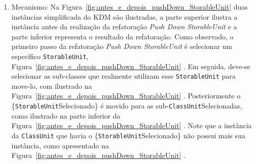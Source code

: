 \begin{enumerate}
\begin{enumerate}
			\item Mecanismo: Na Figura~\ref{fig:antes_e_depois_pushDown_StorableUnit} duas instâncias simplificada do KDM são ilustradas, a parte superior ilustra a instância antes da realização da refatoração \textit{Push Down StorableUnit} e a parte inferior representa o resultado da refatoração. Como observado, o primeiro passo da refatoração \textit{Push Down StorableUnit} é selecionar um específico \texttt{StorableUnit}, Figura~\ref{fig:antes_e_depois_pushDown_StorableUnit} . Em seguida, deve-se selecionar as sub-classes que realmente utilizam esse \texttt{StorableUnit} para move-lo, com ilustrado na Figura~\ref{fig:antes_e_depois_pushDown_StorableUnit} . Posteriormente o \{\texttt{StorableUnit}Selecionado\} é movido para as sub-\texttt{ClassUnit}Selecionadas, como ilustrado na parte inferior da Figura~\ref{fig:antes_e_depois_pushDown_StorableUnit} . Note que a instância da \texttt{ClassUnit} que havia o \{\texttt{StorableUnit}Selecionado\} não possui mais sua instância, como apresentado na Figura~\ref{fig:antes_e_depois_pushDown_StorableUnit} .
			

\end{enumerate}
\end{enumerate}
